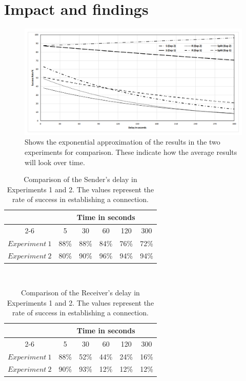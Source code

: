 \section{Impact and findings}
%
\begin{figure}[th]
  \centering
  \includegraphics[width=\textwidth]{Figures/Experiment_comp}
  \decoRule
  \caption[Experiment comparison]{Shows the exponential approximation of the results in the two experiments for comparison. These indicate how the average results will look over time.}
  \label{fig:expcomp}
\end{figure}
%
\begin{table}
	\caption[Comparison of Sender's delay]{Comparison of the Sender's delay in Experiments 1 and 2. The values represent the rate of success in establishing a connection.}
	\label{tab:comp_send}
	\centering
	\begin{tabular}{c@{\qquad}ccccc}
	    \multirow{3}{*}{\raisebox{-\heavyrulewidth}{\textit{S}}} & \multicolumn{5}{c}{Time in seconds}\\
	  	\cmidrule{2-6}
        & 5 & 30 & 60 & 120 & 300\\
        \midrule
        $Experiment~1$ & 88\% & 88\% & 84\% & 76\% & 72\% \\
        $Experiment~2$ & 80\% & 90\% & 96\% & 94\% & 94\% \\
        \bottomrule
	\end{tabular}\\
\end{table}
%
\begin{table}
	\caption[Comparison of Receiver's delay]{Comparison of the Receiver's delay in Experiments 1 and 2. The values represent the rate of success in establishing a connection.}
	\label{tab:comp_recv}
	\centering
	\begin{tabular}{c@{\qquad}ccccc}
		\multirow{3}{*}{\raisebox{-\heavyrulewidth}{\textit{R}}} & \multicolumn{5}{c}{Time in seconds}\\
	  	\cmidrule{2-6}
        & 5 & 30 & 60 & 120 & 300\\
        \midrule
        $Experiment~1$ & 88\% & 52\% & 44\% & 24\% & 16\% \\
        $Experiment~2$ & 90\% & 93\% & 12\% & 12\% & 12\% \\
        \bottomrule
	\end{tabular}\\
\end{table}
